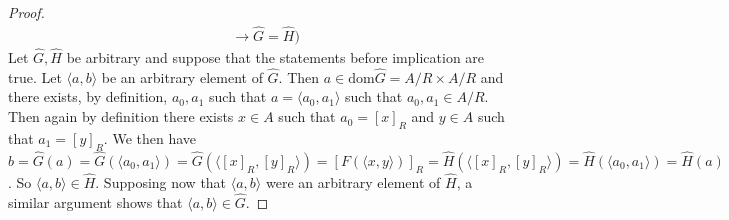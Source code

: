 \documentclass{report}
\begin{document}
\begin{proof}
\begin{align*}
&\to\hat G=\hat H)
\end{align*}
Let $\hat G,\hat H$ be arbitrary and suppose that the statements before implication are true.
Let $\langle a,b\rangle$ be an arbitrary element of $\hat G$. Then $a\in\text{dom}\hat G=A/R\times A/R$ and there exists, by definition, $a_0,a_1$ such that $a=\langle a_0,a_1\rangle$ such that 
$a_0,a_1\in A/R$. Then again by definition there exists $x\in A$ such that $a_0=[x]_R$ and $y\in A$ such that $a_1=[y]_R$.
We then have $b=\hat G(a)=\hat G(\langle a_0,a_1\rangle)=\hat G(\langle[x]_R,[y]_R\rangle)=[F(\langle x,y\rangle)]_R=\hat H(\langle[x]_R,[y]_R\rangle)=\hat H(\langle a_0,a_1\rangle)=\hat H(a)$.
So $\langle a,b\rangle\in\hat H$. Supposing now that $\langle a,b\rangle$ were an arbitrary element of $\hat H$, a similar argument shows that $\langle a,b\rangle\in\hat G$.
\end{proof}
\newpage
\end{document}
